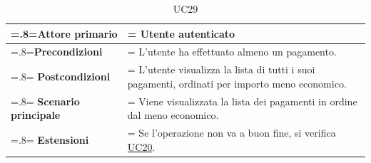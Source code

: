             \begin{table}[H]
                \centering
                \renewcommand{\arraystretch}{1.8}
                \renewcommand\tabularxcolumn[1]{m{#1}}
                \begin{tabularx}{0.9\textwidth} {
                    >{\hsize=.8\hsize\linewidth=\hsize}X
                    >{\hsize=1.2\hsize\linewidth=\hsize}X}
                    \hline
                    \textbf{Attore primario} & Utente autenticato \\
                    \hline
                    \textbf{Precondizioni} & L'utente ha effettuato almeno un pagamento. \\
                    \hline
                    \textbf{Postcondizioni} & L'utente visualizza la lista di tutti i suoi pagamenti, ordinati per importo meno economico. \\
                    \hline
                    \textbf{Scenario principale} & Viene visualizzata la lista dei pagamenti in ordine dal meno economico. \\
                    \hline
                    \textbf{Estensioni} & Se l'operazione non va a buon fine, si verifica \hyperref[UC20]{UC20}. \\
                    \hline
                \end{tabularx}
                \caption{UC29}
            \end{table}

\pagebreak